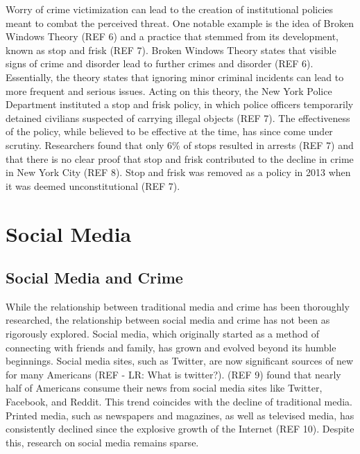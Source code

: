 \documentclass[12pt,oneside, letterpaper]{book}
\begin{document}
\par Worry of crime victimization can lead to the creation of institutional policies meant to combat the perceived threat. One notable example is the idea of Broken Windows Theory (REF 6) and a practice that stemmed from its development, known as stop and frisk (REF 7). Broken Windows Theory states that visible signs of crime and disorder lead to further crimes and disorder (REF 6). Essentially, the theory states that ignoring minor criminal incidents can lead to more frequent and serious issues. Acting on this theory, the New York Police Department instituted a stop and frisk policy, in which police officers temporarily detained civilians suspected of carrying illegal objects (REF 7). The effectiveness of the policy, while believed to be effective at the time, has since come under scrutiny. Researchers found that only 6\% of stops resulted in arrests (REF 7) and that there is no clear proof that stop and frisk contributed to the decline in crime in New York City (REF 8). Stop and frisk was removed as a policy in 2013 when it was deemed unconstitutional (REF 7).

\section{Social Media}

\subsection{Social Media and Crime}

\par While the relationship between traditional media and crime has been thoroughly researched, the relationship between social media and crime has not been as rigorously explored. Social media, which originally started as a method of connecting with friends and family, has grown and evolved beyond its humble beginnings. Social media sites, such as Twitter, are now significant sources of new for many Americans (REF - LR: What is twitter?). (REF 9) found that nearly half of Americans consume their news from social media sites like Twitter, Facebook, and Reddit. This trend coincides with the decline of traditional media. Printed media, such as newspapers and magazines, as well as televised media, has consistently declined since the explosive growth of the Internet (REF 10). Despite this, research on social media remains sparse.

\end{document}

